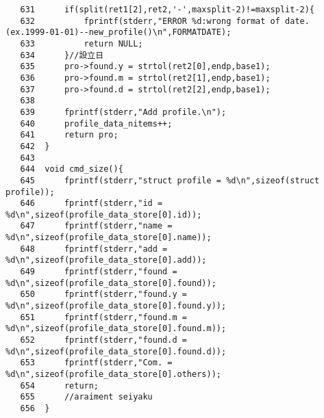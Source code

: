 \documentclass[a4j,11pt]{jarticle}
\begin{document}
{\begin{verbatim}
   631	    if(split(ret1[2],ret2,'-',maxsplit-2)!=maxsplit-2){
   632	        fprintf(stderr,"ERROR %d:wrong format of date.(ex.1999-01-01)--new_profile()\n",FORMATDATE);
   633	        return NULL;
   634	    }//設立日
   635	    pro->found.y = strtol(ret2[0],endp,base1);
   636	    pro->found.m = strtol(ret2[1],endp,base1);
   637	    pro->found.d = strtol(ret2[2],endp,base1);
   638	    
   639	    fprintf(stderr,"Add profile.\n");
   640	    profile_data_nitems++;
   641	    return pro;
   642	}
   643	
   644	void cmd_size(){
   645	    fprintf(stderr,"struct profile = %d\n",sizeof(struct profile));
   646	    fprintf(stderr,"id = %d\n",sizeof(profile_data_store[0].id));
   647	    fprintf(stderr,"name = %d\n",sizeof(profile_data_store[0].name));
   648	    fprintf(stderr,"add = %d\n",sizeof(profile_data_store[0].add));
   649	    fprintf(stderr,"found = %d\n",sizeof(profile_data_store[0].found));
   650	    fprintf(stderr,"found.y = %d\n",sizeof(profile_data_store[0].found.y));
   651	    fprintf(stderr,"found.m = %d\n",sizeof(profile_data_store[0].found.m));
   652	    fprintf(stderr,"found.d = %d\n",sizeof(profile_data_store[0].found.d));
   653	    fprintf(stderr,"Com. = %d\n",sizeof(profile_data_store[0].others));
   654	    return;
   655	    //araiment seiyaku
   656	}
\end{verbatim}
}
\end{document}
